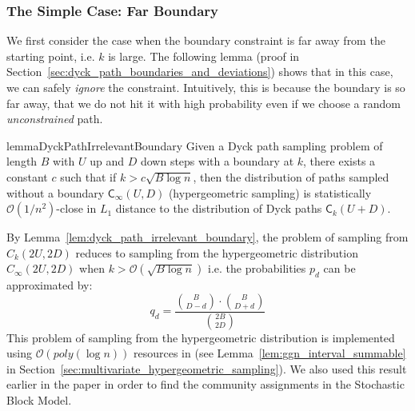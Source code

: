 \subsubsection{The Simple Case: Far Boundary}%
\label{sec:the_simple_case}
We first consider the case when the boundary constraint is far away from the starting point, i.e. $k$ is large.
The following lemma (proof in Section~\ref{sec:dyck_path_boundaries_and_deviations}) shows that in this case,
we can safely \emph{ignore} the constraint.  Intuitively, this is because the boundary is so far away,
that we do not hit it with high probability even if we choose a random \emph{unconstrained} path.
\begin{restatable}{lemma}{DyckPathIrrelevantBoundary}
\label{lem:dyck_path_irrelevant_boundary}
Given a Dyck path sampling problem of length $B$ with $U$ up and $D$ down steps with a boundary at $k$,
there exists a constant $c$ such that if $k > c \sqrt{B\log n}$, then the distribution of paths sampled without a boundary $\mathsf C_{\infty}(U,D)$
(hypergeometric sampling) is statistically $\mathcal O(1/n^2)$-close in $L_1$ distance to the distribution of Dyck paths $\mathsf C_k(U+D)$.
\end{restatable}
By Lemma~\ref{lem:dyck_path_irrelevant_boundary}, the problem of sampling from $C_k(2U,2D)$
reduces to sampling from the hypergeometric distribution $C_{\infty}(2U,2D)$ when $k>\mathcal{O}(\sqrt{B\log n})$
i.e. the probabilities $p_d$ can be approximated by:
\[
q_d = \frac{{{B}\choose{D-d}}\cdot{{B}\choose{D+d}}}{{{2B}\choose{2D}}}
\]
This problem of sampling from the hypergeometric distribution is implemented using $\mathcal O(poly(\log n))$ resources in \cite{huge}
(see Lemma~\ref{lem:ggn_interval_summable} in Section~\ref{sec:multivariate_hypergeometric_sampling}).
We also used this result earlier in the paper in order to find the community assignments in the Stochastic Block Model.

